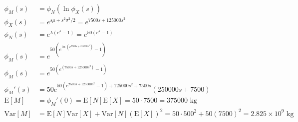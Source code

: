 \documentclass[12pt]{article}
\begin{document}
\begin{enumerate}
\begin{equation*}
    \begin{aligned}
        \phi_M(s) &= \phi_N(\ln \phi_X(s)) \\
        \phi_X(s) &= e^{s\mu + s^2\sigma^2 / 2} = e^{7500s + 125000s^2}\\
        \phi_N(s) &= e^{\lambda(e^s - 1)} = e^{50(e^s-1)} \\
        \phi_M(s) &= e^{50(e^{\ln(e^{7500s + 125000s^2})}-1)} \\
        \phi_M(s) &= e^{50(e^{(7500s + 125000s^2)}-1)} \\
        \phi_M'(s) &= 50e^{50\left(e^{7500s+125000s^2}-1\right)+125000s^2+7500s}\left(250000s+7500\right) \\
        \text{E}[M] &= \phi_M'(0) = \text{E}[N]\text{E}[X] = 50\cdot7500 = 375000 \text{ kg} \\
        \text{Var}[M] &= \text{E}[N]\text{Var}[X] + \text{Var}[N](\text{E}[X])^2 = 50\cdot500^2 + 50(7500)^2 = 2.825 \times 10^9 \text{ kg}
    \end{aligned}
    \end{equation*}
\end{enumerate}
\end{document}
